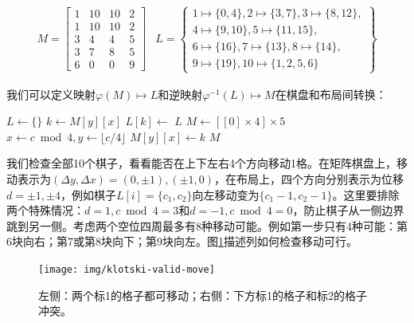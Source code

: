 \documentclass[b5paper]{ctexart}
\begin{document}
\[
\begin{array}{cc}
M = \left [
  \begin{array}{cccc}
  1 & 10 & 10 & 2 \\
  1 & 10 & 10 & 2 \\
  3 & 4 & 4 & 5 \\
  3 & 7 & 8 & 5 \\
  6 & 0 & 0 & 9
  \end{array}
\right ] &
L = \left \{
  \begin{array}{l}
  1 \mapsto \{0, 4\}, 2 \mapsto \{3, 7\}, 3 \mapsto \{8, 12\}, \\
  4 \mapsto \{9, 10\}, 5 \mapsto \{11, 15\}, \\
  6 \mapsto \{16\}, 7 \mapsto \{ 13 \}, 8 \mapsto \{ 14 \}, \\
  9 \mapsto \{ 19 \}, 10 \mapsto \{1, 2, 5, 6\}
  \end{array}
\right \}
\end{array}
\]

我们可以定义映射$\varphi(M) \mapsto L$和逆映射$\varphi^{-1}(L) \mapsto M$在棋盘和布局间转换：

\begin{algorithmic}[1]
  \State $L \gets \{ \}$
      \State $k \gets M[y][x]$
      \State $L[k] \gets$ 
    \EndFor
  \EndFor
  \State \Return $L$
\EndFunction
\Statex
{}
  \State $M \gets [[0] \times 4] \times 5$
      \State $x \gets c \bmod 4, y \gets \lfloor c / 4\rfloor$
      \State $M[y][x] \gets k$
    \EndFor
  \EndFor
  \State \Return $M$
\EndFunction
\end{algorithmic}

我们检查全部10个棋子，看看能否在上下左右4个方向移动1格。在矩阵棋盘上，移动表示为$(\Delta y, \Delta x) = (0, \pm 1), (\pm 1, 0)$，在布局上，四个方向分别表示为位移$d = \pm 1, \pm 4$，例如棋子$L[i] = \{c_1, c_2\}$向左移动变为$\{c_1 -1, c_2 -1\}$。这里要排除两个特殊情况：$d = 1, c \bmod 4 = 3$和$d = -1, c \bmod 4 = 0$，防止棋子从一侧边界跳到另一侧。考虑两个空位四周最多有8种移动可能。例如第一步只有4种可能：第6块向右；第7或第8块向下；第9块向左。图\ref{fig:klotski-valid-move}描述列如何检查移动可行。

\begin{figure}[htbp]
 \centering
 \texttt{[image: img/klotski-valid-move]}
 \caption{左侧：两个标1的格子都可移动；右侧：下方标1的格子和标2的格子冲突。}
 \label{fig:klotski-valid-move}
\end{figure}
\end{document}
